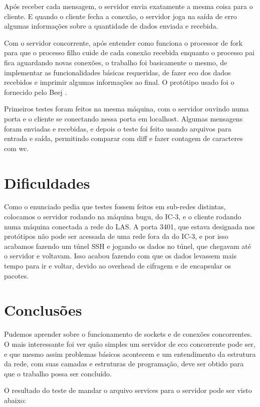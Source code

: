 \documentclass[12pt,a4paper]{article}
\begin{document}
Após receber cada mensagem, o servidor envia exatamente a mesma coisa
para o cliente. E quando o cliente fecha a conexão, o servidor joga na
saída de erro algumas informações sobre a quantidade de dados enviada
e recebida.

Com o servidor concorrente, após entender como funciona o processor de
fork para que o processo filho cuide de cada conexão recebida enquanto
o processo pai fica aguardando novas conexões, o trabalho foi
basicamente o mesmo, de implementar as funcionalidades básicas
requeridas, de fazer eco dos dados recebidos e imprimir algumas
informações ao final. O protótipo usado foi o fornecido pelo Beej \cite{beej}.

Primeiros testes foram feitos na mesma máquina, com o servidor ouvindo
numa porta e o cliente se conectando nessa porta em localhost. Algumas
mensagens foram enviadas e recebidas, e depois o teste foi feito
usando arquivos para entrada e saída, permitindo comparar com diff e
fazer contagem de caracteres com wc.

\section{Dificuldades}

Como o enunciado pedia que testes fossem feitos em sub-redes
distintas, colocamos o servidor rodando na máquina bugu, do IC-3, e o
cliente rodando numa máquina conectada a rede do LAS. 
A porta 3401, que estava designada nos protótipos não pode ser
acessada de uma rede fora da do IC-3, e por isso acabamos fazendo um
túnel SSH e jogando os dados no túnel, que chegavam até o servidor e
voltavam. Isso acabou fazendo com que os dados levassem mais tempo
para ir e voltar, devido ao overhead de cifragem e de encapsular os pacotes.

\section{Conclusões}

Pudemos aprender sobre o funcionamento de sockets e de conexões
concorrentes. O mais interessante foi ver quão simples um servidor de
eco concorrente pode ser, e que mesmo assim problemas básicos
acontecem e um entendimento da estrutura da rede, com suas camadas e
estruturas de programação, deve ser obtido para que o trabalho possa
ser concluído.

O resultado do teste de mandar o arquivo services para o servidor pode
ser visto abaixo:
\end{document}
